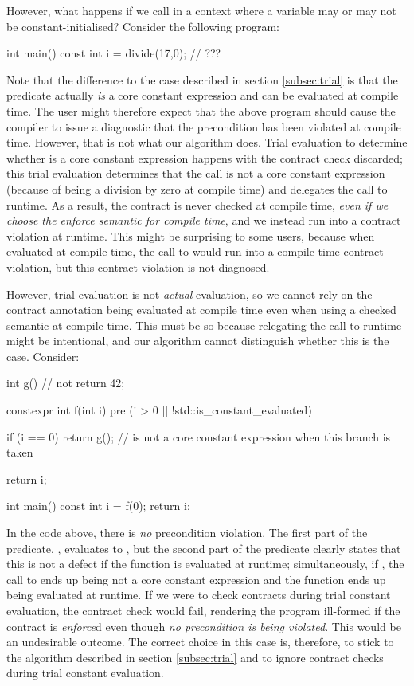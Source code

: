 However, what happens if we call  in a context where a variable may or may not be constant-initialised? Consider the following program:

\begin{codeblock}
int main() {
  const int i = divide(17,0);   // ???
}
\end{codeblock}

Note that the difference to the case described in section \ref{subsec:trial} is that the predicate actually \emph{is} a core constant expression and can be evaluated at compile time. The user might therefore expect that the above program should cause the compiler to issue a diagnostic that the precondition has been violated at compile time. However, that is not what our algorithm does. Trial evaluation to determine whether  is a core constant expression happens with the contract check discarded; this trial evaluation determines that the call is not a core constant expression (because of  being a division by zero at compile time) and delegates the call to runtime. As a result, the contract is never checked at compile time, \emph{even if we choose the enforce semantic for compile time}, and we instead run into a contract violation at runtime. This might be surprising to some users, because when evaluated at compile time, the call to  would run into a compile-time contract violation, but this contract violation is not diagnosed.

However, trial evaluation is not \emph{actual} evaluation, so we cannot rely on the contract annotation being evaluated at compile time even when using a checked semantic at compile time. This must be so because relegating the call to runtime might be intentional, and our algorithm cannot distinguish whether this is the case. Consider:

\begin{codeblock}
int g() {   // not 
  return 42;
}

constexpr int f(int i)
  pre (i > 0 || !std::is_constant_evaluated)
{
  if (i == 0)
    return g();   //  is not a core constant expression when this branch is taken

  return i;
}

int main() {
  const int i = f(0);
  return i;
}
\end{codeblock}

In the code above, there is \emph{no} precondition violation. The first part of the predicate, , evaluates to , but the second part of the predicate clearly states that this is not a defect if the function is evaluated at runtime; simultaneously, if , the call to  ends up being not a core constant expression and the function  ends up being evaluated at runtime. If we were to check contracts during trial constant evaluation, the contract check would fail, rendering the program ill-formed if the contract is \emph{enforce}d even though \emph{no precondition is being violated}. This would be an undesirable outcome. The correct choice in this case is, therefore, to stick to the algorithm described in section \ref{subsec:trial} and to ignore contract checks during trial constant evaluation.

